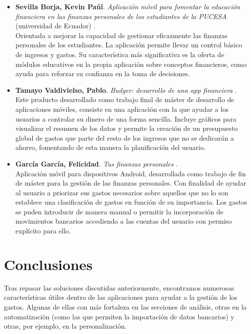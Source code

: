 \begin{itemize}
    \item \textbf{Sevilla Borja, Kevin Paúl}. 
    \textit{Aplicación móvil para fomentar la educación financiera en las finanzas personales 
    de los estudiantes de la PUCESA} (universidad de Ecuador) \cite{sevilla2024aplicacion}. \\
    Orientada a mejorar la capacidad
    de gestionar eficazmente las finanzas personales de los estudiantes. La aplicación 
    permite llevar un control básico de ingresos y gastos. Su característica más significativa 
    es la oferta de módulos educativos en la propia aplicación sobre conceptos financieros, como 
    ayuda para reforzar su confianza en la toma de decisiones.

    \item \textbf{Tamayo Valdivielso, Pablo}. 
    \textit{Budger: desarrollo de una app financiera} \cite{tamayo2022aplicacion}. \\ 
    Este producto desarrollado como 
    trabajo final de máster de desarrollo de aplicaciones móviles, consiste en una aplicación 
    con la que ayudar a los usuarios a controlar su dinero de una forma sencilla. Incluye 
    gráficos para visualizar el resumen de los datos y 
    permite la creación de un presupuesto global de gastos que parte del resto de los ingresos 
    que no se dedicarán a ahorro, fomentando de esta manera la planificación del usuario.

    \item \textbf{García García, Felicidad}. 
    \textit{Tus finanzas personales} \cite{garcia2019aplicacion}. \\  
    Aplicación móvil para dispositivos Android, 
    desarrollada como trabajo de fin de máster para la gestión de las finanzas personales. 
    Con finalidad de ayudar al usuario a priorizar sus gastos necesarios sobre aquellos
    que no lo son establece una clasificación de gastos en función de su importancia. 
    Los gastos se puden introducir de manera manual o permitir la incorporación de 
    movimientos bancarios accediendo a las cuentas del usuario con permiso explícito para ello.
    
\end{itemize}

\section{Conclusiones}
Tras repasar las soluciones discutidas anteriormente, encontramos numerosas 
características útiles dentro de las aplicaciones para ayudar a la gestión 
de los gastos. Algunas de ellas con más fortaleza en las secciones de análisis, 
otras en la automatización (como las que permiten la importación de datos bancarios) y  
otras, por ejemplo, en la personalización. 

